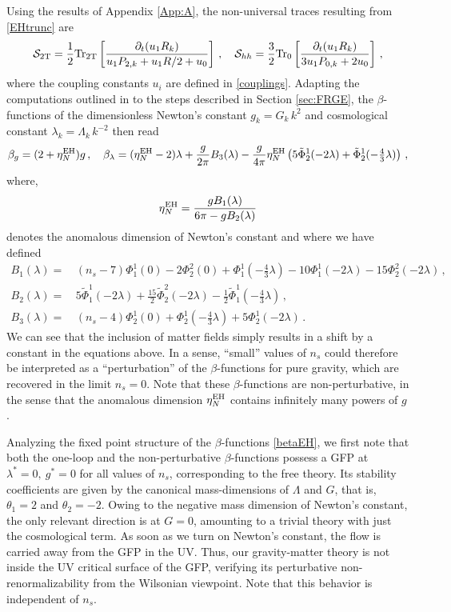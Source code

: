 \documentclass[preprint,preprintnumbers,amsmath,amssymb,nofootinbib,APS]{revtex4}
\newcommand{\be}{\begin{equation}}
\newcommand{\ee}{\end{equation}}
\newcommand{\Tr}{{\rm Tr}}
\newcommand{\cS}{\mathcal{S}}
\newcommand{\Pt}{\tilde{\Phi}}
\newcommand{\2}{\sqrt{2\,}}
\newcommand{\p}{\partial}
\begin{document}
Using the results of Appendix \ref{App:A}, the non-universal traces resulting from \eqref{EHtrunc}
are 
%
\be\label{NU-EH}
\cS_{\rm 2T} = \frac{1}{2} \Tr_{\rm 2T} \left[ \frac{\p_t(u_1 R_k)}{u_1 P_{2,k} + u_1 R/2 + u_0} \right] \, , 
\quad
\cS_{hh} = \frac{3}{2} \Tr_{\rm 0} \left[ \frac{\p_t(u_1 R_k)}{3 u_1 P_{0,k} + 2 u_0} \right] \, ,
\ee
%
where the coupling constants $u_i$ are defined in \eqref{couplings}.
Adapting the computations outlined in \cite{Reuter:2007rv,Codello:2008vh} to the steps described in Section \ref{sec:FRGE}, the $\beta$-functions of the dimensionless Newton's constant $g_k = G_k \, k^2$ and cosmological constant $\lambda_k =  \Lambda_k \, k^{-2}$ then
read
\be \label{betaEH}
\beta_g = (2 + \eta_N^{\rm EH}) g \, , \quad \beta_\lambda = (\eta_N^{\rm EH}-2) \lambda + \frac{g}{2 \pi} B_3(\lambda) - \frac{g}{4\pi} \eta_N^{\rm EH} 
\left(5 \Pt^1_2(-2\lambda) + \Pt^1_2(-\tfrac{4}{3}\lambda) \right)\, ,
\ee
%
where,
%
\be\label{etaEH}
\eta_N^{\rm EH} = \frac{g B_1(\lambda)}{6 \pi - g B_2(\lambda)}
\ee 
%
denotes the anomalous dimension of Newton's constant and where we have defined
%
\be\label{BEH}
\begin{split}
B_1(\lambda) = & \, (n_s - 7) \Phi^1_1(0) - 2 \Phi^2_2(0) + \Phi^1_1(-\tfrac{4}{3}\lambda)  - 10 \Phi^1_1(-2\lambda) - 15 \Phi^2_2(-2\lambda) \, , \\
B_2(\lambda) = & \, 5 \Pt^1_1(-2\lambda) + \tfrac{15}{2} \Pt^2_2(-2\lambda) - \tfrac{1}{2} \Pt^1_1(- \tfrac{4}{3} \lambda) \, , \\
B_3(\lambda) = & \, (n_s - 4) \Phi^1_2(0) + \Phi^1_2(-\tfrac{4}{3}\lambda) + 5 \Phi^1_2(-2\lambda) \, . 
\end{split}
\ee
%
We can see that the inclusion of matter fields simply results in a shift by a constant in the equations above. In a sense, ``small'' values of $n_s$ could therefore be interpreted as a ``perturbation'' of the $\beta$-functions for pure gravity, which are recovered in the limit $n_s = 0$.
Note that these $\beta$-functions are non-perturbative, in the sense that the anomalous dimension $\eta_N^{\rm EH}$ contains infinitely many powers of $g$. 
 
Analyzing the fixed point structure of the $\beta$-functions \eqref{betaEH}, we first note that both the one-loop and the non-perturbative $\beta$-functions possess a GFP at $\lambda^* = 0,\ g^* = 0$ for all values of $n_s$, corresponding to the free theory. Its stability coefficients are given by the canonical mass-dimensions of $\Lambda$ and $G$, that is, $\theta_1 = 2$ and $\theta_2 = -2$. Owing to the negative mass dimension of Newton's constant, the only relevant direction is at $G=0$, amounting to a trivial theory with just the cosmological term. As soon as we turn on Newton's constant, the flow is carried away from the GFP in the UV. Thus, our gravity-matter theory is not inside the UV critical surface of the GFP, verifying its perturbative non-renormalizability from the Wilsonian viewpoint. Note that this behavior is independent of $n_s$.
\end{document}
